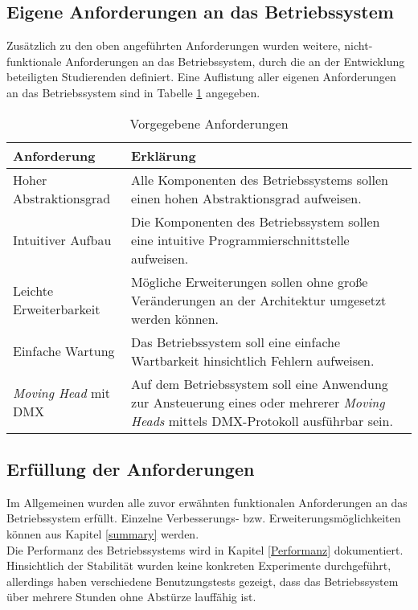 \subsection{Eigene Anforderungen an das Betriebssystem}
Zusätzlich zu den oben angeführten Anforderungen wurden weitere, nicht-funktionale Anforderungen an das Betriebssystem, durch die an der Entwicklung beteiligten Studierenden definiert. Eine Auflistung aller eigenen Anforderungen an das Betriebssystem sind in Tabelle \ref{table:Own-Requirements} angegeben.

\begin{table}[H]
\begin{tabular}{ p{5cm}| p{9cm} }
  \textbf{Anforderung} & \textbf{Erklärung} \\ 
  \hline
  Hoher Abstraktionsgrad & Alle Komponenten des Betriebssystems sollen einen hohen Abstraktionsgrad aufweisen. \\
  Intuitiver Aufbau & Die Komponenten des Betriebssystem sollen eine intuitive Programmierschnittstelle aufweisen. \\
  Leichte Erweiterbarkeit & Mögliche Erweiterungen sollen ohne große Veränderungen an der Architektur umgesetzt werden können. \\
  Einfache Wartung & Das Betriebssystem soll eine einfache Wartbarkeit hinsichtlich Fehlern aufweisen. \\
  \textit{Moving Head} mit \ac{DMX} & Auf dem Betriebssystem soll eine Anwendung zur Ansteuerung eines oder mehrerer \textit{Moving Heads} mittels \ac{DMX}-Protokoll ausführbar sein. \\
 \end{tabular}
 \caption{Vorgegebene Anforderungen}
 \label{table:Own-Requirements}
\end{table}

\subsection{Erfüllung der Anforderungen}
Im Allgemeinen wurden alle zuvor erwähnten funktionalen Anforderungen an das Betriebssystem erfüllt. Einzelne Verbesserungs- bzw. Erweiterungsmöglichkeiten können aus Kapitel \ref{summary} werden. \\
Die Performanz des Betriebssystems wird in Kapitel \ref{Performanz} dokumentiert.
Hinsichtlich der Stabilität wurden keine konkreten Experimente durchgeführt, allerdings haben verschiedene Benutzungstests gezeigt, dass das Betriebssystem über mehrere Stunden ohne Abstürze lauffähig ist.

\pagebreak 